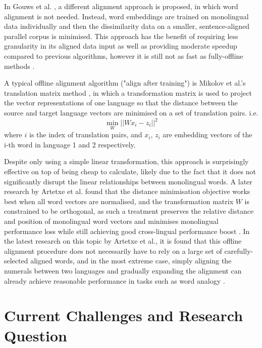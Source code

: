 \documentclass[]{article}
\begin{document}
In Gouws et al. \cite{gouws2015bilbowa}, a different alignment approach is proposed, in which word alignment is not needed. Instead, word embeddings are trained on monolingual data individually and then the dissimilarity data on a smaller, sentence-aligned parallel corpus is minimised. This approach has the benefit of requiring less granularity in its aligned data input as well as providing moderate speedup compared to previous algorithms, however it is still not as fast as fully-offline methods \cite{gouws2015bilbowa}.

A typical offline alignment algorithm ("align after training") is Mikolov et al.'s translation matrix method \cite{mikolov2013exploiting}, in which a transformation matrix is used to project the vector representations of one language so that the distance between the source and target language vectors are minimised on a set of translation pairs. i.e.
\[ \min_W || Wx_i - z_i||^2 \] where $i$ is the index of translation pairs, and $x_i$, $z_i$ are embedding vectors of the i-th word in language 1 and 2 respectively.

Despite only using a simple linear transformation, this approach is surprisingly effective on top of being cheap to calculate, likely due to the fact that it does not significantly disrupt the linear relationships between monolingual words. A later research by Artetxe et al. found that the distance minimisation objective works best when all word vectors are normalised, and the transformation matrix $W$ is constrained to be orthogonal, as such a treatment preserves the relative distance and position of monolingual word vectors and minimises monolingual performance loss while still achieving good cross-lingual performance boost \cite{artetxe2016learning}. In the latest research on this topic by Artetxe et al., it is found that this offline alignment procedure does not necessarily have to rely on a large set of carefully-selected aligned words, and in the most extreme case, simply aligning the numerals between two languages and gradually expanding the alignment can already achieve reasonable performance in tasks such as word analogy \cite{artetxe2017learning}.


\section{Current Challenges and Research Question}
\end{document}
